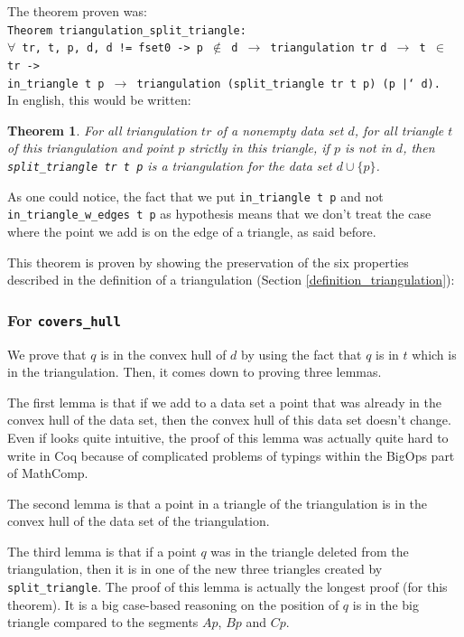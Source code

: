 \documentclass[a4paper,10pt]{article}
\newtheorem{theorem}{Theorem}
\begin{document}
 The theorem proven was:\\
{\tt Theorem triangulation\_split\_triangle:\\
  $\forall$ tr, t, p, d, d != fset0 -> p $\notin$ d $\rightarrow$
                        triangulation tr d $\rightarrow$ t $\in$ tr ->\\
                        in\_triangle t p $\rightarrow$
                        triangulation (split\_triangle tr t p) (p |` d).\\
                       }
In english, this would be written:
\begin{theorem}
  For all triangulation $tr$ of a nonempty data set $d$,
  for all triangle $t$ of this triangulation and point $p$ strictly in this triangle,
  if $p$ is not in $d$, then
  {\tt split\_triangle tr t p} is a triangulation for the data set $d \cup \{p\}$.
\end{theorem}

As one could notice, the fact that we put {\tt in\_triangle t p} and not {\tt in\_triangle\_w\_edges t p} as hypothesis means that we don't treat the case where the point we add is on the edge of a triangle, as said before. 

This theorem is proven by showing the preservation of the six properties described in the definition of a triangulation (Section \ref{definition_triangulation}):
\subsubsection{For {\tt covers\_hull}}
\label{cvh1}
We prove that $q$ is in the convex hull of $d$ by using the fact that $q$ is in $t$ which is in the triangulation. Then, it comes down to proving three lemmas.

  The first lemma is that if we add to a data set a point that was already in the convex hull of the data set, then the convex hull of this data set doesn't change. Even if looks quite intuitive, the proof of this lemma was actually quite hard to write in {\sc Coq} because of complicated problems of typings within the BigOps part of {\sc MathComp}. 
  
  The second lemma is that a point in a triangle of the triangulation is in the convex hull of the data set of the triangulation.

  The third lemma is that if a point $q$ was in the triangle deleted from the triangulation, then it is in one of the new three triangles created by {\tt split\_triangle}. The proof of this lemma is actually the longest proof (for this theorem).
  It is a big case-based reasoning on the position of $q$ is in the big triangle compared to the segments $Ap$, $Bp$ and $Cp$.
  
\end{document}
